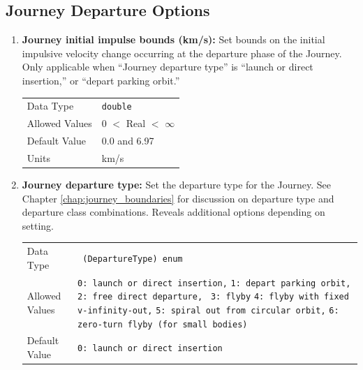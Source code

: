 \subsection{Journey Departure Options}
    \begin{enumerate}
    \item \textbf{Journey initial impulse bounds (km/s):} Set bounds on the initial impulsive velocity change occurring at the departure phase of the Journey. Only applicable when ``Journey departure type'' is ``launch or direct insertion,'' or ``depart parking orbit.''
    
        \begin{table}[H]
            \hspace{2cm}
            \begin{tabular}{ll}
            Data Type & \verb|double| \\
            Allowed Values & 0 $<$ Real $<$ $\infty$ \\
            Default Value & 0.0 and 6.97\\
            Units & km/s
            \end{tabular}
        \end{table}

    \item \textbf{Journey departure type:} Set the departure type for the Journey. See Chapter \ref{chap:journey_boundaries} for discussion on departure type and departure class combinations. Reveals additional options depending on setting.
    
        \begin{table}[H]
            \hspace{2cm}
            \begin{tabular}{lp{3cm}}
            Data Type & \verb| (DepartureType) enum| \\
            Allowed Values & \verb|0: launch or direct insertion,|\newline
            \verb|1: depart parking orbit,| \newline 
            \verb|2: free direct departure, |\newline
            \verb|3: flyby| \newline 
            \verb|4: flyby with fixed v-infinity-out,| \newline 
            \verb|5: spiral out from circular orbit,| \newline
            \verb|6: zero-turn flyby (for small bodies)| \\
            Default Value & \verb|0: launch or direct insertion |\\
            \end{tabular}
        \end{table}


\end{enumerate}
